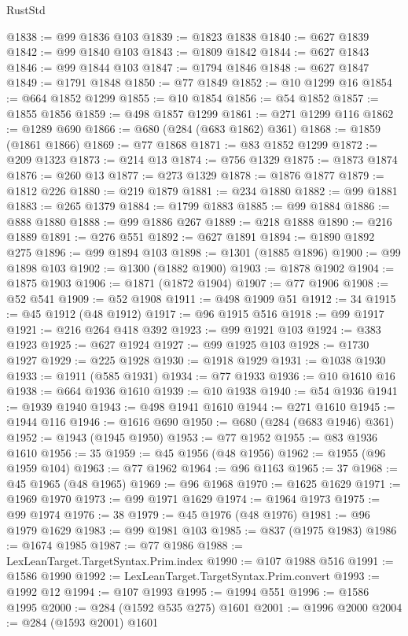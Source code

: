 \begin{lexlean}{RustStd}
\begin{coremodule}
@1838 := @99 @1836 @103
@1839 := @1823 @1838
@1840 := @627 @1839
@1842 := @99 @1840 @103
@1843 := @1809 @1842
@1844 := @627 @1843
@1846 := @99 @1844 @103
@1847 := @1794 @1846
@1848 := @627 @1847
@1849 := @1791 @1848
@1850 := @77 @1849
@1852 := @10 @1299 @16
@1854 := @664 @1852 @1299
@1855 := @10 @1854
@1856 := @54 @1852
@1857 := @1855 @1856
@1859 := @498 @1857 @1299
@1861 := @271 @1299 @116
@1862 := @1289 @690
@1866 := @680 (@284 (@683 @1862) @361)
@1868 := @1859 (@1861 @1866)
@1869 := @77 @1868
@1871 := @83 @1852 @1299
@1872 := @209 @1323
@1873 := @214 @13
@1874 := @756 @1329
@1875 := @1873 @1874
@1876 := @260 @13
@1877 := @273 @1329
@1878 := @1876 @1877
@1879 := @1812 @226
@1880 := @219 @1879
@1881 := @234 @1880
@1882 := @99 @1881
@1883 := @265 @1379
@1884 := @1799 @1883
@1885 := @99 @1884
@1886 := @888 @1880
@1888 := @99 @1886 @267
@1889 := @218 @1888
@1890 := @216 @1889
@1891 := @276 @551
@1892 := @627 @1891
@1894 := @1890 @1892 @275
@1896 := @99 @1894 @103
@1898 := @1301 (@1885 @1896)
@1900 := @99 @1898 @103
@1902 := @1300 (@1882 @1900)
@1903 := @1878 @1902
@1904 := @1875 @1903
@1906 := @1871 (@1872 @1904)
@1907 := @77 @1906
@1908 := @52 @541
@1909 := @52 @1908
@1911 := @498 @1909 @51
@1912 := 34
@1915 := @45 @1912 (@48 @1912)
@1917 := @96 @1915 @516
@1918 := @99 @1917
@1921 := @216 @264 @418 @392
@1923 := @99 @1921 @103
@1924 := @383 @1923
@1925 := @627 @1924
@1927 := @99 @1925 @103
@1928 := @1730 @1927
@1929 := @225 @1928
@1930 := @1918 @1929
@1931 := @1038 @1930
@1933 := @1911 (@585 @1931)
@1934 := @77 @1933
@1936 := @10 @1610 @16
@1938 := @664 @1936 @1610
@1939 := @10 @1938
@1940 := @54 @1936
@1941 := @1939 @1940
@1943 := @498 @1941 @1610
@1944 := @271 @1610
@1945 := @1944 @116
@1946 := @1616 @690
@1950 := @680 (@284 (@683 @1946) @361)
@1952 := @1943 (@1945 @1950)
@1953 := @77 @1952
@1955 := @83 @1936 @1610
@1956 := 35
@1959 := @45 @1956 (@48 @1956)
@1962 := @1955 (@96 @1959 @104)
@1963 := @77 @1962
@1964 := @96 @1163
@1965 := 37
@1968 := @45 @1965 (@48 @1965)
@1969 := @96 @1968
@1970 := @1625 @1629
@1971 := @1969 @1970
@1973 := @99 @1971 @1629
@1974 := @1964 @1973
@1975 := @99 @1974
@1976 := 38
@1979 := @45 @1976 (@48 @1976)
@1981 := @96 @1979 @1629
@1983 := @99 @1981 @103
@1985 := @837 (@1975 @1983)
@1986 := @1674 @1985
@1987 := @77 @1986
@1988 := LexLeanTarget.TargetSyntax.Prim.index
@1990 := @107 @1988 @516
@1991 := @1586 @1990
@1992 := LexLeanTarget.TargetSyntax.Prim.convert
@1993 := @1992 @12
@1994 := @107 @1993
@1995 := @1994 @551
@1996 := @1586 @1995
@2000 := @284 (@1592 @535 @275) @1601
@2001 := @1996 @2000
@2004 := @284 (@1593 @2001) @1601

\end{coremodule}
\end{lexlean}
